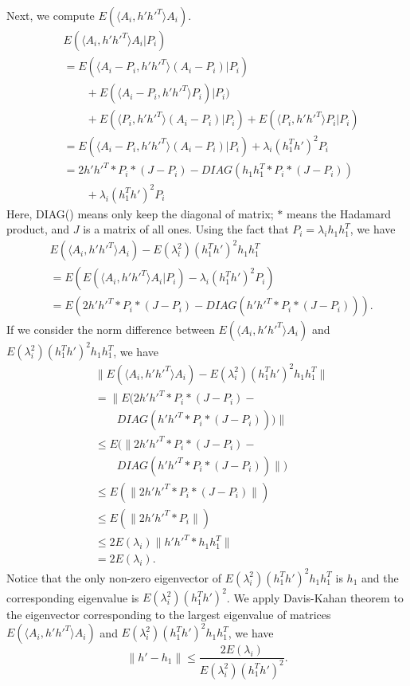 \documentclass[10pt,journal,compsoc]{IEEEtran}
\newenvironment{proof}[1][Proof]{\begin{trivlist}
		\item[\hskip \labelsep {\bfseries #1}]}{\end{trivlist}}
\begin{document}
\begin{proof} [Proof of Theorem 4.2]
	\noindent Next, we compute $E(\langle A_{i},h' h'^T \rangle A_{i})$.
	\begin{align*}
	&E(\langle A_{i},h' h'^T \rangle A_{i}|P_i)    \\
	&=E( \langle A_{i}-P_i,h' h'^T \rangle (A_{i}-P_i)|P_i)\\
	&\qquad {}+E(\langle A_{i}-P_i,h' h'^T \rangle P_i)|P_i) \\
	&\qquad {} +E(\langle P_i,h' h'^T \rangle (A_{i}-P_i)|P_i)+E(\langle P_i,h' h'^T \rangle P_i|P_i) \\
	&= E(\langle A_{i}-P_i,h' h'^T \rangle (A_{i}-P_i)|P_i) + \lambda_i (h_1^Th')^2 P_i \\
	&=  2h' h'^T *P_i*(J-P_i) - DIAG(h_1 h_1^T *P_i*(J-P_i)) 	\\
	&\qquad {}+\lambda_i (h_1^Th')^2 P_i 
	\end{align*}
	Here, DIAG() means only keep the diagonal of matrix; $*$ means the Hadamard product, and $J$ is a matrix of all ones. Using the fact that $P_i=\lambda_i h_1 h_1 ^T$, we have 
	\begin{align*}
	&E(\langle A_{i},h' h'^T \rangle A_{i}) - E(\lambda_i^2) (h_1^Th')^2 h_1 h_1^T \\
	&=E(E(\langle A_{i},h' h'^T \rangle A_{i}|P_i)-\lambda_i (h_1^Th')^2 P_i) 
	 \\
	&= E(2 h' h'^T *P_i*(J-P_i) - DIAG(h' h'^T*P_i*(J-P_i))).
	\end{align*}
	If we consider the norm difference between $E( \langle A_{i},h' h'^T \rangle A_{i})$ and $ E(\lambda_i^2) (h_1^Th')^2 h_1 h_1^T$, we have
	\begin{align*}
	&\|E(\langle A_{i},h' h'^T \rangle A_{i} ) - E(\lambda_i^2) (h_1^Th')^2 h_1 h_1^T\| \\
	&= \|E(2 h' h'^T *P_i*(J-P_i) - \\
	&\qquad DIAG(h' h'^T*P_i*(J-P_i)))\| \\
	&\leq  E(\|2 h' h'^T *P_i*(J-P_i) - \\
	&\qquad DIAG(h' h'^T*P_i*(J-P_i))\|) \\
	&\leq  E(\|2 h' h'^T *P_i*(J-P_i)\|) \\
	&\leq  E(\|2 h' h'^T * P_i\|) \\
	&\leq  2 E(\lambda_i)\| h' h'^T * h_1 h_1^T\| \\
	&=  2 E(\lambda_i) .
	\end{align*}
	Notice that the only non-zero eigenvector of $E(\lambda_i^2) (h_1^Th')^2 h_1 h_1^T$ is $h_1$ and the corresponding eigenvalue is $E(\lambda_i^2) (h_1^Th')^2$. We apply Davis-Kahan theorem \cite{davis1970rotation} to the eigenvector corresponding to the largest eigenvalue of matrices $E(\langle A_{i},h' h'^T \rangle A_{i} )$ and $E(\lambda_i^2) (h_1^Th')^2 h_1 h_1^T$, we have
	\[\|h'-h_1\| \leq \frac{2 E(\lambda_i)}{E(\lambda_i^2)(h_1^T h')^2}. \]
\end{proof}
\end{document}
